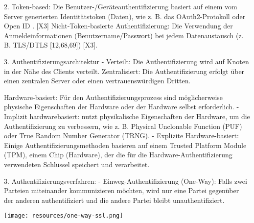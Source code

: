 2. Token-based:
Die Benutzer-/Geräteauthentifizierung basiert auf einem vom Server generierten Identitätstoken (Daten), wie z. B. das OAuth2-Protokoll oder Open ID . [X3]
Nicht-Token-basierte Authentifizierung: Die Verwendung der Anmeldeinformationen (Benutzername/Passwort) bei jedem Datenaustausch (z. B. TLS/DTLS [12,68,69]) [X3].

3. Authentifizierungsarchitektur
- Verteilt: Die Authentifizierung wird auf Knoten in der Nähe des Clients verteilt. 
Zentralisiert: Die Authentifizierung erfolgt über einen zentralen Server oder einen vertrauenswürdigen Dritten.

Hardware-basiert: Für den Authentifizierungsprozess sind möglicherweise physische Eigenschaften der Hardware oder der Hardware selbst erforderlich. - Implizit hardwarebasiert: nutzt physikalische Eigenschaften der Hardware, um die Authentifizierung zu verbessern, wie z. B. Physical Unclonable Function (PUF) oder True Random Number Generator (TRNG).
- Explizite Hardware-basiert: Einige Authentifizierungsmethoden basieren auf einem Trusted Platform Module (TPM), einem Chip (Hardware), der die für die Hardware-Authentifizierung verwendeten Schlüssel speichert und verarbeitet.

3. Authentifizierungsverfahren:
- Einweg-Authentifizierung (One-Way): Falls zwei Parteien miteinander kommunizieren möchten, wird nur eine Partei gegenüber der anderen authentifiziert und die andere Partei bleibt unauthentifiziert.


\texttt{[image: resources/one-way-ssl.png]}

